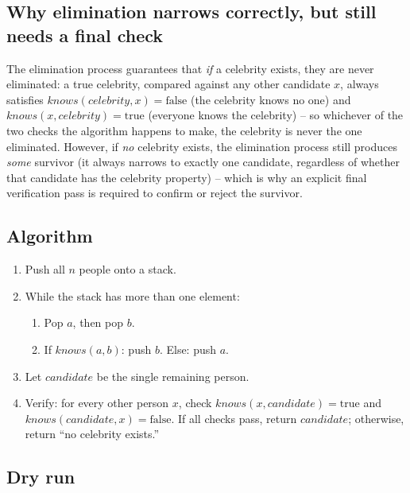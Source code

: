 \subsection*{Why elimination narrows correctly, but still needs a final check}

The elimination process guarantees that \emph{if} a celebrity exists, they
are never eliminated: a true celebrity, compared against any other
candidate $x$, always satisfies $\textit{knows}(\textit{celebrity}, x) =
\text{false}$ (the celebrity knows no one) and
$\textit{knows}(x, \textit{celebrity}) = \text{true}$ (everyone knows the
celebrity) -- so whichever of the two checks the algorithm happens to make,
the celebrity is never the one eliminated. However, if \emph{no}
celebrity exists, the elimination process still produces \emph{some}
survivor (it always narrows to exactly one candidate, regardless of
whether that candidate has the celebrity property) -- which is why an
explicit final verification pass is required to confirm or reject the
survivor.

\subsection*{Algorithm}

\begin{enumerate}
  \item Push all $n$ people onto a stack.
  \item While the stack has more than one element:
  \begin{enumerate}
    \item Pop $a$, then pop $b$.
    \item If $\textit{knows}(a,b)$: push $b$. Else: push $a$.
  \end{enumerate}
  \item Let $\textit{candidate}$ be the single remaining person.
  \item Verify: for every other person $x$, check
        $\textit{knows}(x, \textit{candidate}) = \text{true}$ and
        $\textit{knows}(\textit{candidate}, x) = \text{false}$. If all
        checks pass, return $\textit{candidate}$; otherwise, return
        ``no celebrity exists.''
\end{enumerate}

\subsection*{Dry run}


